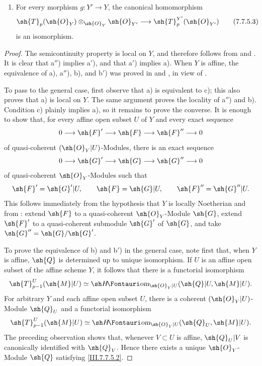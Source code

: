 {\begin{theorem}[7.7.5]
\begin{enumerate}
  \item[d)] For every morphism $g:Y'\to Y$, the canonical
    homomorphism
    \[
      \sh{T}_p(\sh{O}_Y)
      \otimes_{\sh{O}_Y}\sh{O}_{Y'}
      \longrightarrow
      \sh{T}^{Y'}_p(\sh{O}_{Y'})
      \tag{7.7.5.3}\label{III.7.7.5.3}
    \]
    is an isomorphism.
\end{enumerate}
\end{theorem}

\begin{proof}
The semicontinuity property is local on $Y$, and therefore
follows from  and .  It is
clear that a$''$) implies a$'$), and that a$'$) implies a).
When $Y$ is affine, the equivalence of a), a$''$), b), and
b$'$) was proved in  and
, in view of .

To pass to the general case, first observe that a) is
equivalent to c); this also proves that a) is local on $Y$.
The same argument proves the locality of a$''$) and b).
Condition c) plainly implies a), so it remains to prove the
converse.  It is enough to show that, for every affine open
subset $U$ of $Y$ and every exact sequence
\[
  0\longrightarrow\sh{F}'
  \longrightarrow\sh{F}
  \longrightarrow\sh{F}''
  \longrightarrow0
\]
of quasi-coherent $(\sh{O}_Y|U)$-Modules, there is an exact
sequence
\[
  0\longrightarrow\sh{G}'
  \longrightarrow\sh{G}
  \longrightarrow\sh{G}''
  \longrightarrow0
\]
of quasi-coherent $\sh{O}_Y$-Modules such that
\[
  \sh{F}'=\sh{G}'|U,
  \qquad
  \sh{F}=\sh{G}|U,
  \qquad
  \sh{F}''=\sh{G}''|U.
\]
This follows immediately from the hypothesis that $Y$ is
locally Noetherian and from : extend
$\sh{F}$ to a quasi-coherent $\sh{O}_Y$-Module $\sh{G}$,
extend $\sh{F}'$ to a quasi-coherent submodule $\sh{G}'$ of
$\sh{G}$, and take $\sh{G}''=\sh{G}/\sh{G}'$.

To prove the equivalence of b) and b$'$) in the general
case, note first that, when $Y$ is affine, $\sh{Q}$ is
determined up to unique isomorphism.  If $U$ is an affine
open subset of the affine scheme $Y$, it follows that there
is a functorial isomorphism
\[
  \sh{T}^{U}_{p-1}(\sh{M}|U)
  \simeq
  \shHom_{\sh{O}_Y|U}
    (\sh{Q}|U,\sh{M}|U).
\]
For arbitrary $Y$ and each affine open subset $U$, there is
a coherent $(\sh{O}_Y|U)$-Module $\sh{Q}_U$ and a
functorial isomorphism
\[
  \sh{T}^{U}_{p-1}(\sh{M}|U)
  \simeq
  \shHom_{\sh{O}_Y|U}
    (\sh{Q}_U,\sh{M}|U).
\]
The preceding observation shows that, whenever $V\subset U$
is affine, $\sh{Q}_U|V$ is canonically identified with
$\sh{Q}_V$.  Hence there exists a unique
$\sh{O}_Y$-Module $\sh{Q}$ satisfying
\eqref{III.7.7.5.2}.


\end{proof}}
